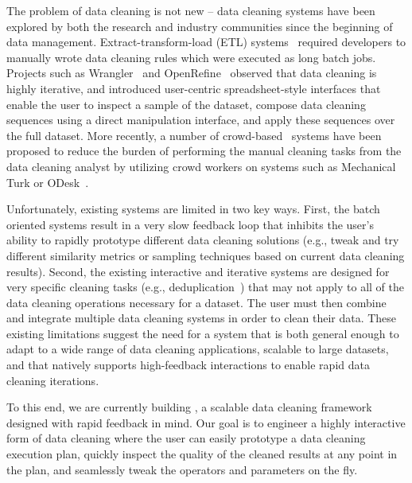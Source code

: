 The problem of data cleaning is not new -- data cleaning systems have been
explored by both the research and industry communities since the beginning of data management.
Extract-transform-load (ETL) systems~\cite{informatica,talend,nadeef}
required developers to manually wrote data cleaning rules which were executed as 
long batch jobs.  
Projects such as Wrangler~\cite{wrangler,trifacta} and
OpenRefine~\cite{googlerefine} observed that data cleaning is highly iterative, and
introduced user-centric spreadsheet-style interfaces that enable the user to inspect a sample of the dataset, 
compose data cleaning sequences using a direct manipulation interface, and apply these sequences over the full dataset.   
More recently, a number of crowd-based~\cite{corleone,tamr}
systems have been proposed to reduce the burden of performing the manual cleaning tasks from the data cleaning analyst 
by utilizing crowd workers on systems such as Mechanical Turk or ODesk~\cite{argonaut}.

Unfortunately, existing systems are limited in two key ways.
First, the batch oriented systems result in a very slow feedback loop 
that inhibits the user's ability to rapidly prototype different data cleaning solutions (e.g., tweak and 
try different similarity metrics or sampling techniques based on current data cleaning results).
Second, the existing interactive and iterative systems are designed for very specific cleaning tasks 
(e.g., deduplication~\cite{corleone,others}) that may not apply to all of the data 
cleaning operations necessary for a dataset.  The user must then combine and integrate multiple
data cleaning systems in order to clean their data.
These existing limitations suggest the need for a system that is both general enough to
adapt to a wide range of data cleaning applications, scalable to large datasets, 
and that natively supports high-feedback interactions to enable rapid data cleaning iterations.

To this end, we are currently building \sys, a scalable data cleaning
framework designed with rapid feedback in mind.  Our goal is to
engineer a highly interactive form of data cleaning where the user can easily prototype a data cleaning execution plan,
quickly inspect the quality of the cleaned results at any point in the plan, and seamlessly
tweak the operators and parameters on the fly.

